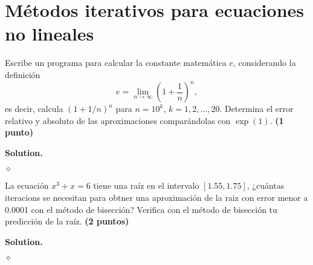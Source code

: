 \documentclass{article}
\theoremstyle{problemstyle}
\newenvironment{solution}{%
  \begin{mdframed}[linewidth=0.8pt,linecolor=Gray,backgroundcolor=Gray!5,roundcorner=5pt, nobreak=true]%
  \noindent\textbf{Solution.}%
}{%
\hfill $ \diamond $ 
  \end{mdframed}%
}
\begin{document}
\section*{M\'etodos iterativos para ecuaciones no lineales}\label{chap:m_etodos_iterativos_para_ecuaciones_no_lineales} %

\begin{problem}
  Escribe un programa para calcular la constante matem\'atica $ e $, considerando la definici\'on
  \[
    e = \lim_{n\to\infty} \left(1+\frac{1}{n}\right)^{n},
  \]
  es decir, calcula $ (1+1/n)^n $ para $ n = 10^k $, $ k = 1, 2,\dots, 20. $ Determina el error relativo y absoluto de las aproximaciones compar\'andolas con $ \exp(1) $. \textbf{(1 punto)}
\end{problem}
\begin{solution}

\end{solution}

\begin{problem}
  La ecuaci\'on $ x^3+x = 6 $ tiene una ra\'iz en el intervalo $ [1.55, 1.75] $, ¿cu\'antas iteracions se necesitan para obtner una aproximaci\'on de la raiz con error menor a 0.0001 con el m\'etodo de bisecci\'on? Verifica con el m\'etodo de bisecci\'on tu predicci\'on de la ra\'iz. \textbf{(2 puntos)}
\end{problem}
\begin{solution}
  
\end{solution}
\end{document}
